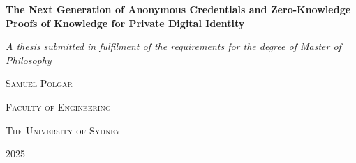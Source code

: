 \begin{titlepage}
    \centering
       {\Huge \textbf{The Next Generation of Anonymous Credentials and Zero-Knowledge Proofs of Knowledge for Private Digital Identity} \par} \vspace{1.5cm}
    {\large \emph{A thesis submitted in fulfilment of the requirements for the degree of Master of Philosophy}\par} \vspace{2cm}
    {\LARGE \textsc{Samuel Polgar} \par} \vspace{9cm}
    {\Large \textsc{Faculty of Engineering}\par}
    {\Large \textsc{The University of Sydney} \par} \vspace{1cm}
    {\large 2025}
\end{titlepage}
